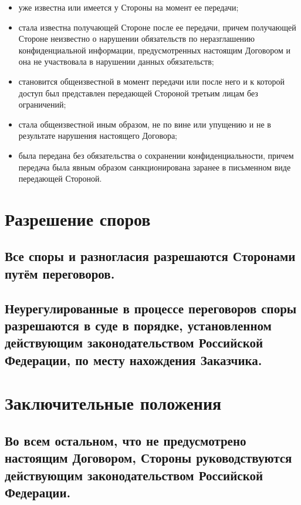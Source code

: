 \documentclass[12pt]{article}
\begin{document}
\begin{itemize}
\item уже известна или имеется у Стороны на момент ее передачи;
\item стала известна получающей Стороне после ее передачи, причем получающей Стороне неизвестно о нарушении обязательств по неразглашению конфиденциальной информации, предусмотренных настоящим Договором и она не участвовала в нарушении данных обязательств;
\item становится общеизвестной в момент передачи или после него и к которой доступ был представлен передающей Стороной третьим лицам без ограничений;
\item стала общеизвестной иным образом, не по вине или упущению и не в результате нарушения настоящего Договора;
\item была передана без обязательства о сохранении конфиденциальности, причем передача была явным образом санкционирована заранее в письменном виде передающей Стороной.
\end{itemize}

\section{Разрешение споров}

\subsection{Все споры и разногласия разрешаются Сторонами путём переговоров.}

\subsection{Неурегулированные в процессе переговоров споры разрешаются в суде в порядке, установленном действующим законодательством Российской Федерации, по месту нахождения Заказчика.}

\newpage
\section{Заключительные положения}

\subsection{Во всем остальном, что не предусмотрено настоящим Договором, Стороны руководствуются действующим законодательством Российской Федерации.}
\end{document}

